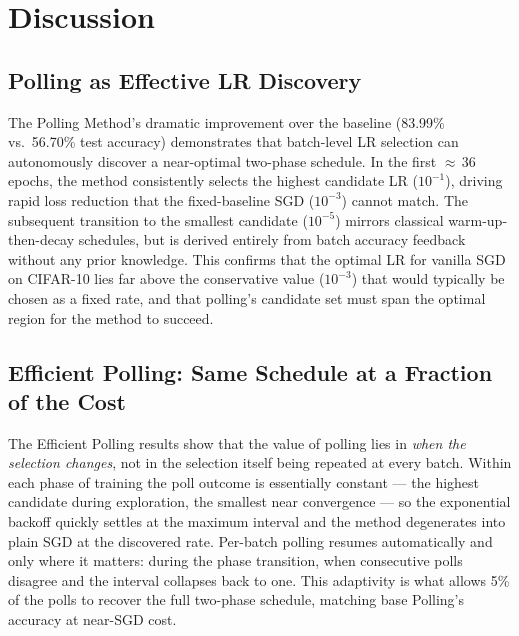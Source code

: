 \documentclass[conference]{IEEEtran}
\begin{document}
\section{Discussion}

\subsection{Polling as Effective LR Discovery}

The Polling Method's dramatic improvement over the baseline (83.99\% vs.\ 56.70\% test accuracy) demonstrates that batch-level LR selection can autonomously discover a near-optimal two-phase schedule. In the first ${\approx}\,36$ epochs, the method consistently selects the highest candidate LR ($10^{-1}$), driving rapid loss reduction that the fixed-baseline SGD ($10^{-3}$) cannot match. The subsequent transition to the smallest candidate ($10^{-5}$) mirrors classical warm-up-then-decay schedules, but is derived entirely from batch accuracy feedback without any prior knowledge. This confirms that the optimal LR for vanilla SGD on CIFAR-10 lies far above the conservative value ($10^{-3}$) that would typically be chosen as a fixed rate, and that polling's candidate set must span the optimal region for the method to succeed.

\subsection{Efficient Polling: Same Schedule at a Fraction of the Cost}

The Efficient Polling results show that the value of polling lies in \emph{when the selection changes}, not in the selection itself being repeated at every batch. Within each phase of training the poll outcome is essentially constant --- the highest candidate during exploration, the smallest near convergence --- so the exponential backoff quickly settles at the maximum interval and the method degenerates into plain SGD at the discovered rate. Per-batch polling resumes automatically and only where it matters: during the phase transition, when consecutive polls disagree and the interval collapses back to one. This adaptivity is what allows 5\% of the polls to recover the full two-phase schedule, matching base Polling's accuracy at near-SGD cost.
\end{document}

